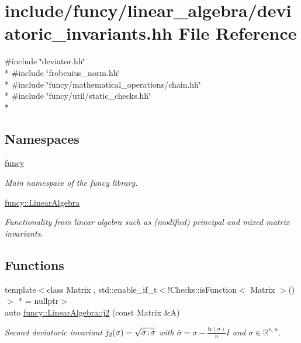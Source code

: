 \hypertarget{deviatoric__invariants_8hh}{\section{include/funcy/linear\-\_\-algebra/deviatoric\-\_\-invariants.hh File Reference}
\label{deviatoric__invariants_8hh}
}
{\ttfamily \#include \char`\"{}deviator.\-hh\char`\"{}}\\*
{\ttfamily \#include \char`\"{}frobenius\-\_\-norm.\-hh\char`\"{}}\\*
{\ttfamily \#include \char`\"{}funcy/mathematical\-\_\-operations/chain.\-hh\char`\"{}}\\*
{\ttfamily \#include \char`\"{}funcy/util/static\-\_\-checks.\-hh\char`\"{}}\\*
\subsection*{Namespaces}
\begin{DoxyCompactItemize}
\item 
\hyperlink{namespacefuncy}{funcy}
\begin{DoxyCompactList}\small\item\em Main namespace of the funcy library. \end{DoxyCompactList}\item 
\hyperlink{namespacefuncy_1_1LinearAlgebra}{funcy\-::\-Linear\-Algebra}
\begin{DoxyCompactList}\small\item\em Functionality from linear algebra such as (modified) principal and mixed matrix invariants. \end{DoxyCompactList}\end{DoxyCompactItemize}
\subsection*{Functions}
\begin{DoxyCompactItemize}
\item 
{\footnotesize template$<$class Matrix , std\-::enable\-\_\-if\-\_\-t$<$!\-Checks\-::is\-Function$<$ Matrix $>$()$>$ $\ast$  = nullptr$>$ }\\auto \hyperlink{group__InvariantGroup_gadc719472ca1df9b0644bf6abc6d660e1}{funcy\-::\-Linear\-Algebra\-::j2} (const Matrix \&A)
\begin{DoxyCompactList}\small\item\em Second deviatoric invariant $ j_2(\sigma)=\sqrt{\bar\sigma\negthinspace:\negthinspace\bar\sigma} $ with $\bar\sigma = \sigma - \frac{\mathrm{tr}(\sigma)}{n}I$ and $\sigma\in\mathbb{R}^{n,n}$. \end{DoxyCompactList}\end{DoxyCompactItemize}
